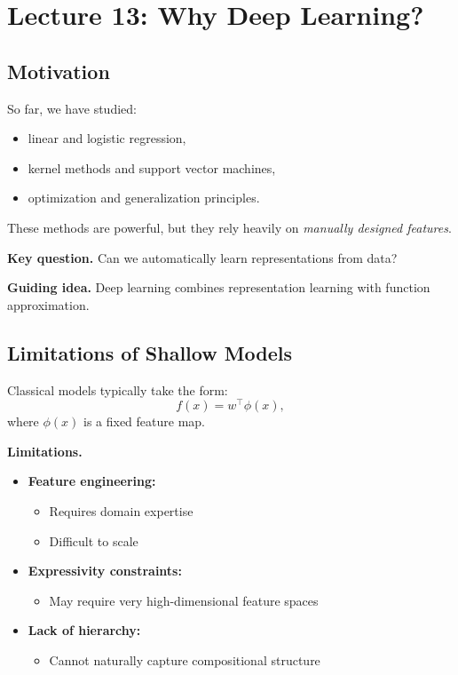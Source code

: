 \section{Lecture 13: Why Deep Learning?}

\subsection{Motivation}

So far, we have studied:

\begin{itemize}
    \item linear and logistic regression,
    \item kernel methods and support vector machines,
    \item optimization and generalization principles.
\end{itemize}

\medskip

\noindent
These methods are powerful, but they rely heavily on \emph{manually designed features}.

\medskip

\noindent
\textbf{Key question.}  
Can we automatically learn representations from data?

\medskip

\noindent
\textbf{Guiding idea.}  
Deep learning combines representation learning with function approximation.

\subsection{Limitations of Shallow Models}

Classical models typically take the form:
\[
f(x) = w^\top \phi(x),
\]
where $\phi(x)$ is a fixed feature map.

\medskip

\noindent
\textbf{Limitations.}

\begin{itemize}
    \item \textbf{Feature engineering:}
    \begin{itemize}
        \item Requires domain expertise
        \item Difficult to scale
    \end{itemize}

    \item \textbf{Expressivity constraints:}
    \begin{itemize}
        \item May require very high-dimensional feature spaces
    \end{itemize}

    \item \textbf{Lack of hierarchy:}
    \begin{itemize}
        \item Cannot naturally capture compositional structure
    \end{itemize}
\end{itemize}

